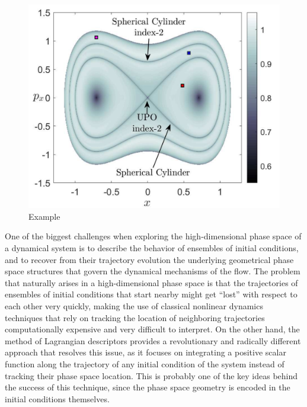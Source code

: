\documentclass[9pt]{article}
\begin{document}
\begin{figure}[htbp]
	\begin{center}
		\includegraphics[scale=0.26]{LD_tau_5_y_-1sqrt2_delta_0_H_02}
	\end{center}
	\caption{Example}
	\label{example}
\end{figure}	

One of the biggest challenges when exploring the high-dimensional phase space of a dynamical system is to describe the behavior of ensembles of initial conditions, and to recover from their trajectory evolution the underlying geometrical phase space structures that govern the dynamical mechanisms of the flow. The problem that naturally arises in a   high-dimensional phase space is that the trajectories of ensembles of initial conditions that start nearby might get ``lost'' with respect to each other very quickly, making the use of classical nonlinear dynamics techniques that rely on tracking the location of neighboring trajectories computationally expensive and very difficult to interpret. On the other hand, the method of Lagrangian descriptors provides a revolutionary and radically different approach that resolves this issue, as it focuses on integrating a positive scalar function along the trajectory of any initial condition of the system instead of tracking their phase space location. This is probably one of the key ideas behind the success of this technique, since the phase space geometry is encoded in the initial conditions themselves.
\end{document}
